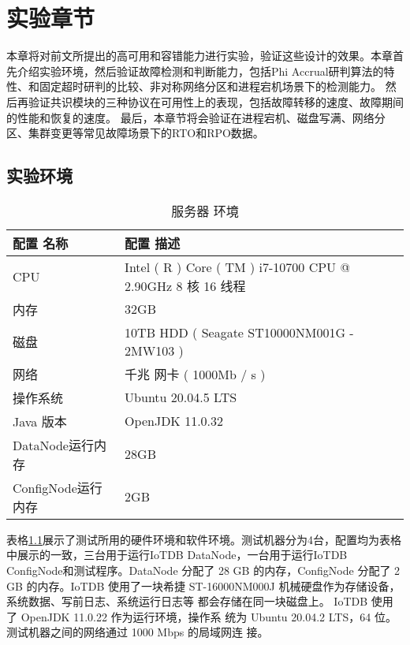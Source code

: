 
\chapter{实验章节}

本章将对前文所提出的高可用和容错能力进行实验，验证这些设计的效果。本章首先介绍实验环境，然后验证故障检测和判断能力，包括Phi Accrual研判算法的特性、和固定超时研判的比较、非对称网络分区和进程宕机场景下的检测能力。
然后再验证共识模块的三种协议在可用性上的表现，包括故障转移的速度、故障期间的性能和恢复的速度。
最后，本章节将会验证在进程宕机、磁盘写满、网络分区、集群变更等常见故障场景下的RTO和RPO数据。


\section{实验环境}


\begin{table}[h!]
    \centering
    \caption{服务器 环境}
    \label{tab:server_environment}
    \begin{tabular}{ll}
        \toprule
        配置 名称 & 配置 描述 \\
        \midrule
        CPU & Intel ( R ) Core ( TM ) i7-10700 CPU @ 2.90GHz 8 核 16 线程 \\
        内存 & 32GB \\
        磁盘 & 10TB HDD ( Seagate ST10000NM001G - 2MW103 ) \\
        网络 & 千兆 网卡 ( 1000Mb / s ) \\
        操作系统 & Ubuntu 20.04.5 LTS \\
        Java 版本 & OpenJDK 11.0.32 \\
        DataNode运行内存 & 28GB \\
        ConfigNode运行内存 & 2GB \\
        \bottomrule
    \end{tabular}
\end{table}

表格\ref{tab:server_environment}展示了测试所用的硬件环境和软件环境。测试机器分为4台，配置均为表格中展示的一致，三台用于运行IoTDB DataNode，一台用于运行IoTDB ConfigNode和测试程序。DataNode
分配了 28 GB 的内存，ConfigNode 分配了 2 GB 的内存。IoTDB 使用了一块希捷
ST-16000NM000J 机械硬盘作为存储设备，系统数据、写前日志、系统运行日志等
都会存储在同一块磁盘上。 IoTDB 使用了 OpenJDK 11.0.22 作为运行环境，操作系
统为 Ubuntu 20.04.2 LTS，64 位。测试机器之间的网络通过 1000 Mbps 的局域网连
接。

